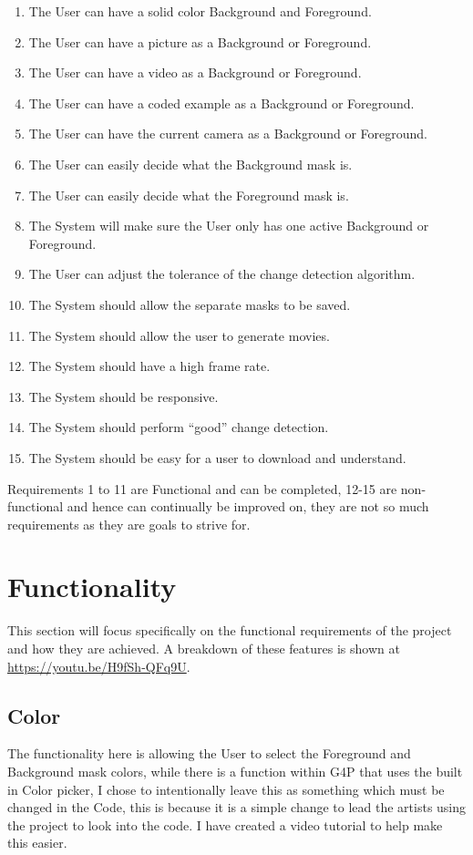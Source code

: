 \documentclass[a4paper]{report}
\begin{document}
\begin{enumerate}
\item The User can have a solid color Background and Foreground.
\item The User can have a picture as a Background or Foreground.
\item The User can have a video as a Background or Foreground.
\item The User can have a coded example as a Background or Foreground.
\item The User can have the current camera as a Background or Foreground.
\item The User can easily decide what the Background mask is.
\item The User can easily decide what the Foreground mask is.
\item The System will make sure the User only has one active Background or Foreground.
\item The User can adjust the tolerance of the change detection algorithm.
\item The System should allow the separate masks to be saved.
\item The System should allow the user to generate movies.
\item The System should have a high frame rate.
\item The System should be responsive.
\item The System should perform “good” change detection.
\item The System should be easy for a user to download and understand.
\end{enumerate}

Requirements 1 to 11 are Functional and can be completed, 12-15 are non-functional and hence can continually be improved on, they are not so much requirements as they are goals to strive for.

\section{Functionality}
This section will focus specifically on the functional requirements of the project and how they are achieved. A breakdown of these features is shown at \url{https://youtu.be/H9fSh-QFq9U}.

\subsection{Color}
The functionality here is allowing the User to select the Foreground and Background mask colors, while there is a function within G4P\cite{G4P} that uses the built in Color picker, I chose to intentionally leave this as something which must be changed in the Code, this is because it is a simple change to lead the artists using the project to look into the code. I have created a video tutorial to help make this easier.
\end{document}
